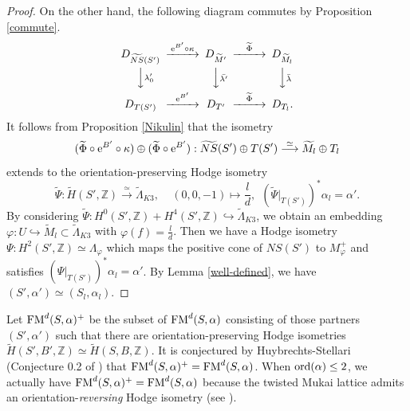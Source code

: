 \documentclass{article}
\theoremstyle{plain}
\theoremstyle{definition}
\theoremstyle{remark}
\newcommand{\Z}{{\mathbb Z}}
\begin{document}
\begin{proof}
On the other hand, 
the following diagram commutes by Proposition \ref{commute}. 
$$
\CD 
D_{\widetilde{NS}(S')} @>{\rm e\/}^{B'} \circ \kappa >> D_{\widetilde{M}'} @>\widetilde{\Phi}>> D_{\widetilde{M}_{l}} \\
@VV\lambda _{0}'V       @ VV\bar{\lambda '}V                        @VV\bar{\lambda }V    \\
D_{T(S')}              @>{\rm e\/}^{B'}>> D_{T'}                          @>\widetilde{\Phi}>> D_{T_{l}} .
\endCD
$$
It follows from Proposition \ref{Nikulin} that  
the isometry 
\begin{equation*}
(\widetilde{\Phi} \circ {\rm e\/}^{B'} \circ \kappa ) \oplus (\widetilde{\Phi} \circ {\rm e\/}^{B'}) : 
\widetilde{NS}(S') \oplus T(S') 
\stackrel{\simeq}{\longrightarrow} 
\widetilde{M}_{l} \oplus T_{l} 
\end{equation*}
extends to 
the orientation-preserving Hodge isometry 
\begin{equation*} 
\widetilde{\Psi} : 
                   \widetilde{H}(S', {\Z}) 
                    \stackrel{\simeq}{\longrightarrow} 
                   \widetilde{\Lambda}_{K3}, \: \: \: \: \: 
(0, 0, -1) \mapsto \frac{l}{d}, \: \:  
(\widetilde{\Psi}|_{T(S')})^{\ast} \alpha _{l} = \alpha '.
\end{equation*}
By considering 
$\widetilde{\Psi} : 
H^{0}(S', {\Z}) + H^{4}(S', {\Z}) 
\hookrightarrow 
\widetilde{\Lambda}_{K3}$, 
we obtain an embedding 
$\varphi : U \hookrightarrow \widetilde{M}_{l} \subset \widetilde{\Lambda }_{K3}$ 
with 
$\varphi (f) = \frac{l}{d}$. 
Then  
we have a Hodge isometry 
$\Psi : H^{2}(S', {\Z}) \simeq \Lambda _{\varphi}$ 
which maps the positive cone of $NS(S')$ 
to $M_{\varphi }^{+}$ 
and satisfies 
$(\Psi |_{T(S')})^{\ast} \alpha _{l} = \alpha '$. 
By Lemma \ref{well-defined}, 
we have 
$(S', \alpha ') \simeq (S_{l}, \alpha _{l})$. 
\end{proof}  












Let 
${\rm FM\/}^{d}(S, \alpha )^{+}$ 
be the subset of 
${\rm FM\/}^{d}(S, \alpha )$ 
consisting of those partners 
$(S', \alpha ')$ such that 
there are orientation-preserving Hodge isometries  
$\widetilde{H}(S', B', {\Z}) \simeq \widetilde{H}(S, B, {\Z})$. 
It is conjectured by Huybrechts-Stellari (Conjecture 0.2 of \cite{H-S1}) that 
${\rm FM\/}^{d}(S, \alpha )^{+} = {\rm FM\/}^{d}(S, \alpha )$. 
When ${\rm ord\/}(\alpha ) \leq 2$, 
we actually have 
${\rm FM\/}^{d}(S, \alpha )^{+} = {\rm FM\/}^{d}(S, \alpha )$ 
because  
the twisted Mukai lattice admits an orientation-{\it reversing\/} Hodge isometry 
(see \cite{H-S1}). 
\end{document}
